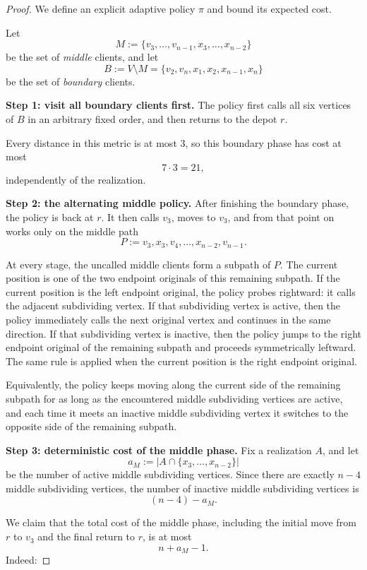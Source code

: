\documentclass[11pt]{amsart}
\begin{document}
\begin{proof}
We define an explicit adaptive policy $\pi$ and bound its expected cost.

Let
\[
M:=\{v_3,\dots,v_{n-1},x_3,\dots,x_{n-2}\}
\]
be the set of \emph{middle} clients, and let
\[
B:=V\setminus M=\{v_2,v_n,x_1,x_2,x_{n-1},x_n\}
\]
be the set of \emph{boundary} clients.

\medskip
\noindent\textbf{Step 1: visit all boundary clients first.}
The policy first calls all six vertices of $B$ in an arbitrary fixed order, and then returns to the depot $r$.

Every distance in this metric is at most $3$, so this boundary phase has cost at most
\[
7\cdot 3=21,
\]
independently of the realization.

\medskip
\noindent\textbf{Step 2: the alternating middle policy.}
After finishing the boundary phase, the policy is back at $r$. It then calls $v_3$, moves to $v_3$, and from that point on works only on the middle path
\[
P:=v_3,x_3,v_4,\dots,x_{n-2},v_{n-1}.
\]

At every stage, the uncalled middle clients form a subpath of $P$. The current position is one of the two endpoint originals of this remaining subpath. If the current position is the left endpoint original, the policy probes rightward: it calls the adjacent subdividing vertex. If that subdividing vertex is active, then the policy immediately calls the next original vertex and continues in the same direction. If that subdividing vertex is inactive, then the policy jumps to the right endpoint original of the remaining subpath and proceeds symmetrically leftward. The same rule is applied when the current position is the right endpoint original.

Equivalently, the policy keeps moving along the current side of the remaining subpath for as long as the encountered middle subdividing vertices are active, and each time it meets an inactive middle subdividing vertex it switches to the opposite side of the remaining subpath.

\medskip
\noindent\textbf{Step 3: deterministic cost of the middle phase.}
Fix a realization $A$, and let
\[
a_M:=|A\cap\{x_3,\dots,x_{n-2}\}|
\]
be the number of active middle subdividing vertices. Since there are exactly $n-4$ middle subdividing vertices, the number of inactive middle subdividing vertices is
\[
(n-4)-a_M.
\]

We claim that the total cost of the middle phase, including the initial move from $r$ to $v_3$ and the final return to $r$, is at most
\[
n+a_M-1.
\]
Indeed:


\end{proof}
\end{document}
